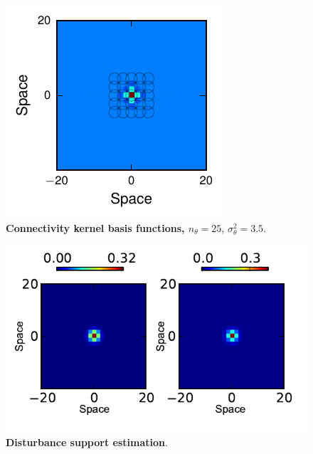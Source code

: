 \documentclass[]{article}
\begin{document}
\begin{figure}[!ht]
\begin{center}
\includegraphics{./Figures/KernelBasis.pdf}
\end{center}
\caption{{\bf Connectivity kernel basis functions, $n_{\theta}=25$}, $\sigma^2_{\theta}=3.5$.}
\label{fig:KernelBasis}
\end{figure}
\begin{figure}[!ht]
\begin{center}
\includegraphics{./Figures/DisturbanceWidthEstimation.pdf}
\end{center}
\caption{{\bf Disturbance support estimation}.}
\label{fig:DisturbanceWidthEstimation}
\end{figure}
\end{document}
